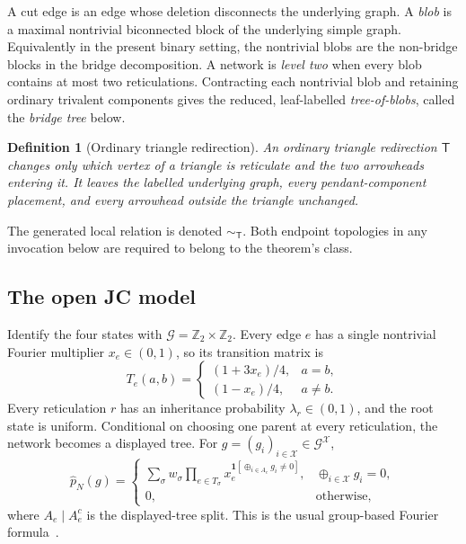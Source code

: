 \documentclass[11pt]{article}
\newtheorem{definition}[theorem]{Definition}
\theoremstyle{remark}
\newcommand{\Ztwo}{\mathbb Z_2}
\newcommand{\State}{\mathcal G}
\newcommand{\Taxa}{\mathcal X}
\newcommand{\Tmove}{\mathsf T}
\newcommand{\xor}{\mathbin\oplus}
\newcommand{\whp}{\widehat p}
\begin{document}
A cut edge is an edge whose deletion disconnects the underlying graph.  A
\emph{blob} is a maximal nontrivial biconnected block of the underlying
simple graph.  Equivalently in the present binary setting, the nontrivial
blobs are the non-bridge blocks in the bridge decomposition.  A network is
\emph{level two} when every blob contains at most two reticulations.
Contracting each nontrivial blob and retaining ordinary trivalent components
gives the reduced, leaf-labelled \emph{tree-of-blobs}, called the
\emph{bridge tree} below.

\begin{definition}[Ordinary triangle redirection]\label{def:T}
An ordinary triangle redirection $\Tmove$ changes only which vertex of a
triangle is reticulate and the two arrowheads entering it.  It leaves the
labelled underlying graph, every pendant-component placement, and every
arrowhead outside the triangle unchanged.
\end{definition}

The generated local relation is denoted $\sim_{\Tmove}$.  Both endpoint
topologies in any invocation below are required to belong to the theorem's
class.

\subsection{The open JC model}

Identify the four states with $\State=\Ztwo\times\Ztwo$.  Every edge $e$ has a
single nontrivial Fourier multiplier $x_e\in(0,1)$, so its transition matrix
is
\[
T_e(a,b)=
\begin{cases}
(1+3x_e)/4,&a=b,\\
(1-x_e)/4,&a\ne b.
\end{cases}
\]
Every reticulation $r$ has an inheritance probability
$\lambda_r\in(0,1)$, and the root state is uniform.  Conditional on choosing
one parent at every reticulation, the network becomes a displayed tree.  For
$g=(g_i)_{i\in\Taxa}\in \State^{\Taxa}$,
\begin{equation}\label{eq:fourier}
\whp_N(g)=
\begin{cases}
\displaystyle\sum_{\sigma}w_\sigma
 \prod_{e\in T_\sigma}
 x_e^{\mathbf1[\xor_{i\in A_e}g_i\ne0]},
 &\xor_{i\in\Taxa}g_i=0,\\[2mm]
0,&\text{otherwise},
\end{cases}
\end{equation}
where $A_e\mid A_e^c$ is the displayed-tree split.  This is the usual
group-based Fourier formula~\cite{EvansSpeed1993,SturmfelsSullivant2005}.
\end{document}

